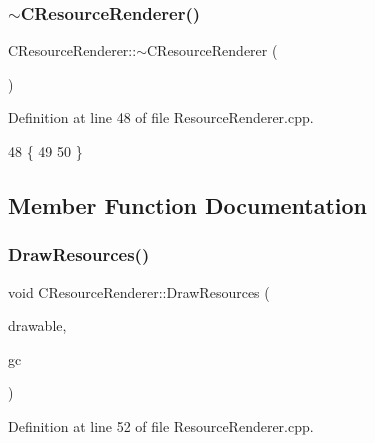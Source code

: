 \subsubsection{\texorpdfstring{$\sim$\+C\+Resource\+Renderer()}{~CResourceRenderer()}}
{\footnotesize\ttfamily C\+Resource\+Renderer\+::$\sim$\+C\+Resource\+Renderer (\begin{DoxyParamCaption}{ }\end{DoxyParamCaption})}



Definition at line 48 of file Resource\+Renderer.\+cpp.


\begin{DoxyCode}
48                                      \{
49 
50 \}
\end{DoxyCode}


\subsection{Member Function Documentation}
\hypertarget{classCResourceRenderer_ad10676ab10fe217aebbc3dca68d745b0}{}\label{classCResourceRenderer_ad10676ab10fe217aebbc3dca68d745b0} 
\subsubsection{\texorpdfstring{Draw\+Resources()}{DrawResources()}}
{\footnotesize\ttfamily void C\+Resource\+Renderer\+::\+Draw\+Resources (\begin{DoxyParamCaption}\item[{Gdk\+Drawable $\ast$}]{drawable,  }\item[{Gdk\+GC $\ast$}]{gc }\end{DoxyParamCaption})}



Definition at line 52 of file Resource\+Renderer.\+cpp.


